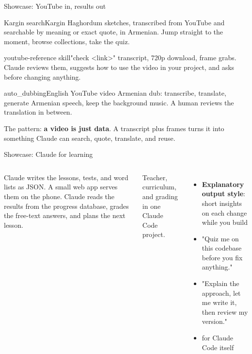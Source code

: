 \documentclass[aspectratio=169,11pt,t]{beamer}
\begin{document}
\begin{frame}{Showcase: YouTube in, results out}
  \begin{tcbraster}[raster columns=3, raster equal height, raster column skip=6pt]
    \begin{card}{Kargin search}Kargin Haghordum sketches, transcribed from YouTube and searchable by meaning or exact quote, in Armenian. Jump straight to the moment, browse collections, take the quiz.\end{card}
    \begin{card}{youtube-reference skill}"check <link>" \ra{} transcript, 720p download, frame grabs. Claude reviews them, suggests how to use the video in your project, and asks before changing anything.\end{card}
    \begin{card}{auto\_dubbing}English YouTube video \ra{} Armenian dub: transcribe, translate, generate Armenian speech, keep the background music. A human reviews the translation in between.\end{card}
  \end{tcbraster}\par\vspace{0.6em}
  {\small The pattern: \textbf{a video is just data}. A transcript plus frames turns it into something Claude can search, quote, translate, and reuse.}
\end{frame}

\begin{frame}{Showcase: Claude for learning}
  \begin{columns}[T,onlytextwidth]
      \par\vspace{0.3em}\small
      Claude writes the lessons, tests, and word lists as JSON. A small web app serves them on the phone. Claude reads the results from the progress database, grades the free-text answers, and plans the next lesson.\par\vspace{0.4em}
      {\footnotesize\color{muted}Teacher, curriculum, and grading in one Claude Code project.}
      \par\vspace{0.3em}
      \begin{itemize}\footnotesize\setlength\itemsep{0.25em}
        \item \textbf{Explanatory output style}: short insights on each change while you build
        \item "Quiz me on this codebase before you fix anything."
        \item "Explain the approach, let me write it, then review my version."
        \item {} for Claude Code itself
      \end{itemize}
  \end{columns}
\end{frame}
\end{document}
